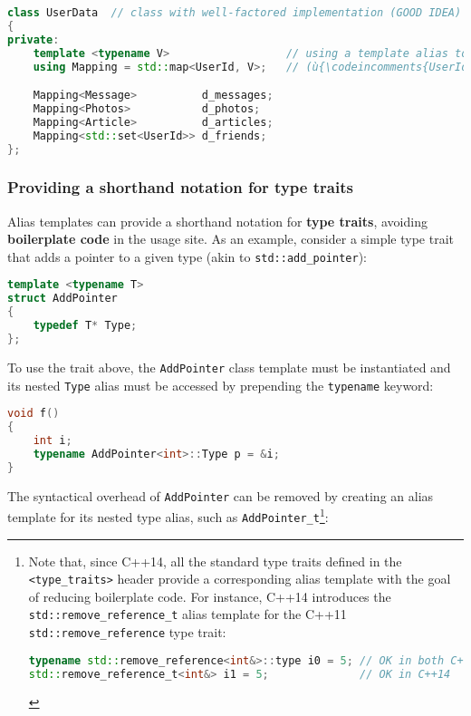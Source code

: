 \begin{lstlisting}[language=C++]
class UserData  // class with well-factored implementation (GOOD IDEA)
{
private:
    template <typename V>                  // using a template alias to bind
    using Mapping = std::map<UserId, V>;   // (ù{\codeincomments{UserId}}ù) as the key type

    Mapping<Message>          d_messages;
    Mapping<Photos>           d_photos;
    Mapping<Article>          d_articles;
    Mapping<std::set<UserId>> d_friends;
};
\end{lstlisting}


\subsubsection[Providing a shorthand notation for type traits]{Providing a shorthand notation for type traits}\label{providing-a-shorthand-notation-for-type-traits}

Alias templates can provide a shorthand notation for \textbf{type
traits}, avoiding \textbf{boilerplate code} in the usage site. As an
example, consider a simple type trait that adds a pointer to a given
type (akin to \texttt{std::add\_pointer}):

\begin{lstlisting}[language=C++]
template <typename T>
struct AddPointer
{
    typedef T* Type;
};
\end{lstlisting}

\noindent To use the trait above, the \texttt{AddPointer} class template
must be instantiated and its nested \texttt{Type} alias must be
accessed by prepending the \texttt{typename} keyword:

\begin{lstlisting}[language=C++]
void f()
{
    int i;
    typename AddPointer<int>::Type p = &i;
}
\end{lstlisting}

\noindent The syntactical overhead of \texttt{AddPointer} can be removed by
creating an alias template for its nested type alias, such as
\texttt{AddPointer\_t}{\cprotect\footnote{Note that, since C++14, all
the standard type traits defined in the \texttt{<type\_traits>} header
provide a corresponding alias template with the goal of reducing
boilerplate code. For instance, C++14 introduces the
\texttt{std::remove\_reference\_t} alias template for the C++11
\texttt{std::remove\_reference} type trait:

\begin{lstlisting}[language=C++, basicstyle={\ttfamily\footnotesize}]
typename std::remove_reference<int&>::type i0 = 5; // OK in both C++11 and C++14
std::remove_reference_t<int&> i1 = 5;              // OK in C++14
\end{lstlisting}
      }}:

